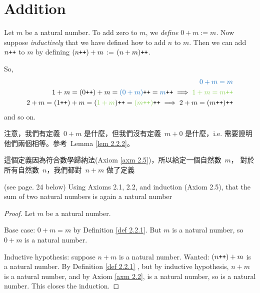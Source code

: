 \section{Addition}\label{sec 2.2}

\begin{definition}  \label{def 2.2.1} Let \(m\) be a natural number. To add zero to \(m\), we \emph{define} \(0 + m := m\). Now suppose \emph{inductively} that we have defined how to add \(n\) to \(m\). Then we can add \(n\texttt{++} \) to \(m\) by defining \((n\texttt{++}) + m\) := \((n + m)\texttt{++}\).
\end{definition}
\begin{note}
So,
\begin{align*}
\BLUE{0 + m = m}\\
1 + m = (0\INC) + m = \BLUE{(0 + m)}\INC = \BLUE{m}\INC \implies \GREEN{1 + m = m\INC} \\
2 + m = (1\INC) + m = (\GREEN{1 + m})\INC = \GREEN{(m\INC)}\INC \implies 2 + m = (m\INC)\INC
\end{align*}
and so on.
\end{note}
\begin{note}
注意，我們有定義\ \(0 + m\) 是什麼，但我們沒有定義\ \(m + 0\) 是什麼，i.e. 需要證明他們兩個相等。參考\ Lemma \ref{lem 2.2.2}。
\end{note}
\begin{note}
這個定義因為符合數學歸納法(Axiom \ref{axm 2.5})，所以給定一個自然數\ \(m\)， 對於所有自然數\ \(n\)，我們都對\ \(n + m\) 做了定義
\end{note}

\begin{additional corollary}\label{ac 2.2.1} (see page. 24 below) Using Axioms 2.1, 2.2, and induction (Axiom 2.5), that the sum of two natural numbers is again a natural number 
\end{additional corollary}
\begin{proof}
Let \(m\) be a natural number.

Base case: \(0 + m = m\) by Definition \ref{def 2.2.1}. But \(m\) is a natural number, so \(0 + m\) is a natural number. 

Inductive hypothesis: suppose \(n + m\) is a natural number. Wanted: \((n\texttt{++}) + m\) is a natural number. By Definition \ref{def 2.2.1} , but by inductive hypothesis, \(n + m\) is a natural number, and by Axiom \ref{axm 2.2},  is a natural number, so  is a natural number. This closes the induction.
\end{proof}

